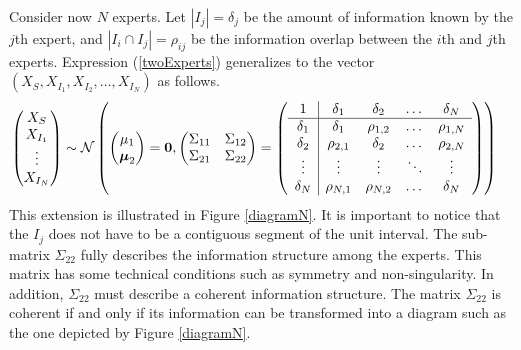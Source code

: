 \documentclass[11pt,twoside]{article}
\begin{document}
Consider now $N$ experts. Let $|I_j| = \delta_j$ be the amount of information known by the $j$th expert, and $|I_i \cap I_j| = \rho_{ij}$ be the information overlap between the $i$th and $j$th experts. Expression (\ref{twoExperts}) generalizes to the vector $(X_{S}, X_{I_1}, X_{I_2}, \dots, X_{I_N})$ as follows.
\begin{align}
\left(\begin{matrix} X_S \\ X_{I_1}\\ \vdots \\ X_{I_N} \end{matrix}\right) &\sim \mathcal{N}\left( \left(\begin{matrix} 
\mu_1 \\ \boldsymbol{\mu}_2
 \end{matrix}\right) =
 \boldsymbol{0}, \left(\begin{matrix} 
\Sigma_{11} & \Sigma_{12}\\
\Sigma_{21} & \Sigma_{22}\\
 \end{matrix}\right) 
 =
 \left(\begin{array}{c | c c cc }
1 & \delta_1 & \delta_2 & \dots & \delta_N  \\ \hline
\delta_1 & \delta_1 &\rho_{1,2} & \dots & \rho_{1,N}   \\ 
\delta_2 & \rho_{2,1} & \delta_2 & \dots & \rho_{2,N}  \\ 
\vdots & \vdots & \vdots & \ddots & \vdots  \\ 
\delta_N & \rho_{N,1} & \rho_{N,2} & \dots & \delta_N\\ 
 \end{array}\right)\right)  \label{NExperts}
\end{align}
This extension is illustrated in Figure \ref{diagramN}. It is important to notice that the $I_j$ does not have to be a contiguous segment of the unit interval. The sub-matrix $\Sigma_{22}$ fully describes the information structure among the experts.  This matrix has some technical conditions such as symmetry and non-singularity. In addition, $\Sigma_{22}$ must describe a coherent information structure. The matrix $\Sigma_{22}$ is coherent if and only if its information can be transformed into a diagram such as the one depicted by Figure \ref{diagramN}. 

\end{document}
